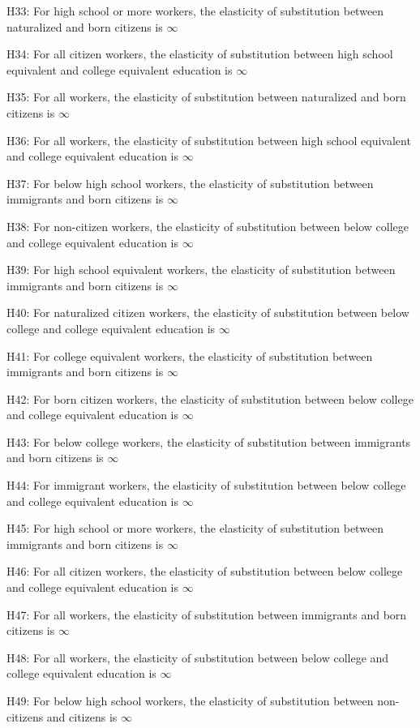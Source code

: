 \documentclass[11pt]{article}
\theoremstyle{definition}
\theoremstyle{remark}
\begin{document}
{H33: For high school or more workers, the elasticity of substitution between naturalized and born citizens is $\infty$

H34: For all citizen workers, the elasticity of substitution between high school equivalent and college equivalent education is $\infty$

H35: For all workers, the elasticity of substitution between naturalized and born citizens is $\infty$

H36: For all workers, the elasticity of substitution between high school equivalent and college equivalent education is $\infty$

H37: For below high school workers, the elasticity of substitution between immigrants and born citizens is $\infty$

H38: For non-citizen workers, the elasticity of substitution between below college and college equivalent education is $\infty$

H39: For high school equivalent workers, the elasticity of substitution between immigrants and born citizens is $\infty$

H40: For naturalized citizen workers, the elasticity of substitution between below college and college equivalent education is $\infty$

H41: For college equivalent workers, the elasticity of substitution between immigrants and born citizens is $\infty$

H42: For born citizen workers, the elasticity of substitution between below college and college equivalent education is $\infty$

H43: For below college workers, the elasticity of substitution between immigrants and born citizens is $\infty$

H44: For immigrant workers, the elasticity of substitution between below college and college equivalent education is $\infty$

H45: For high school or more workers, the elasticity of substitution between immigrants and born citizens is $\infty$

H46: For all citizen workers, the elasticity of substitution between below college and college equivalent education is $\infty$

H47: For all workers, the elasticity of substitution between immigrants and born citizens is $\infty$

H48: For all workers, the elasticity of substitution between below college and college equivalent education is $\infty$

H49: For below high school workers, the elasticity of substitution between non-citizens and citizens is $\infty$

}
\end{document}
